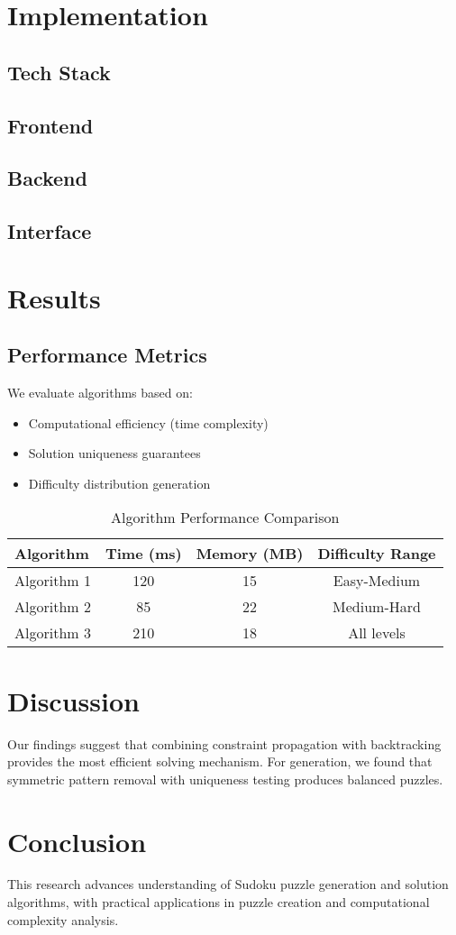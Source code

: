 \documentclass[12pt,a4paper]{article}
\begin{document}
\section{Implementation}
\subsection{Tech Stack}
\subsection{Frontend}
\subsection{Backend}
\subsection{Interface}

\section{Results}
\subsection{Performance Metrics}
We evaluate algorithms based on:
\begin{itemize}
    \item Computational efficiency (time complexity)
    \item Solution uniqueness guarantees
    \item Difficulty distribution generation
\end{itemize}

\begin{table}[h]
\centering
\caption{Algorithm Performance Comparison}
\begin{tabular}{lccc}
\toprule
Algorithm & Time (ms) & Memory (MB) & Difficulty Range \\
\midrule
Algorithm 1 & 120 & 15 & Easy-Medium \\
Algorithm 2 & 85 & 22 & Medium-Hard \\
Algorithm 3 & 210 & 18 & All levels \\
\bottomrule
\end{tabular}
\end{table}

\section{Discussion}
Our findings suggest that combining constraint propagation with backtracking provides the most efficient solving mechanism. For generation, we found that symmetric pattern removal with uniqueness testing produces balanced puzzles.

\section{Conclusion}
This research advances understanding of Sudoku puzzle generation and solution algorithms, with practical applications in puzzle creation and computational complexity analysis.



\end{document}
